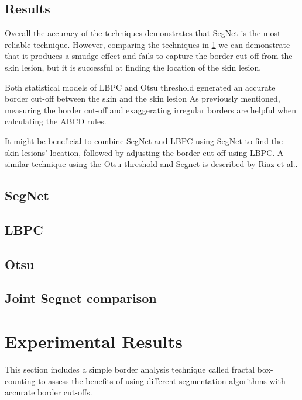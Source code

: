 \subsection{Results}
Overall the accuracy of the techniques demonstrates that SegNet is the most reliable technique. However, comparing the techniques in \ref{} we can demonstrate that it produces a smudge effect and fails to capture the border cut-off from the skin lesion, but it is successful at finding the location of the skin lesion.

Both statistical models of LBPC and Otsu threshold generated an accurate border cut-off between the skin and the skin lesion As previously mentioned, measuring the border cut-off and exaggerating irregular borders are helpful when calculating the ABCD rules. 

It might be beneficial to combine SegNet and LBPC using SegNet to find the skin lesions' location, followed by adjusting the border cut-off using LBPC. A similar technique using the Otsu threshold and Segnet is described by Riaz et al.\cite{Riaz2019}.


\subsection{SegNet}

\subsection{LBPC}

\subsection{Otsu}

\subsection{Joint Segnet comparison}


\section{Experimental Results}
This section includes a simple border analysis technique called fractal box-counting to assess the benefits of using different segmentation algorithms with accurate border cut-offs.

